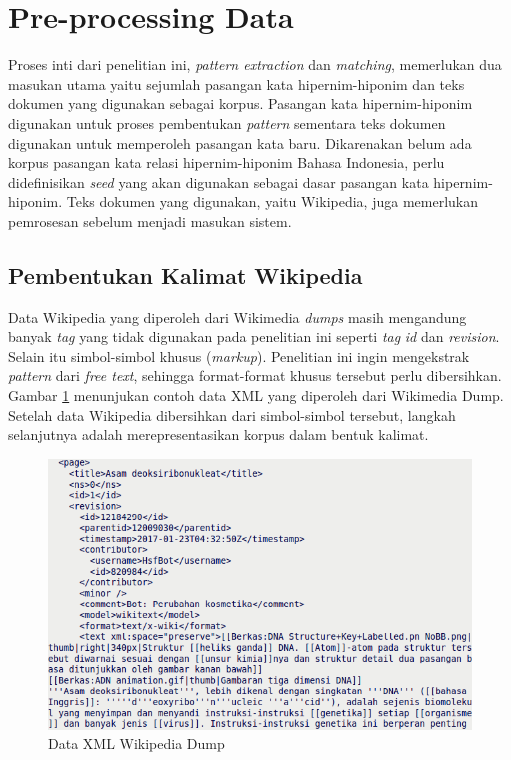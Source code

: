 \section{Pre-processing Data}
Proses inti dari penelitian ini, \textit{pattern extraction} dan \textit{matching}, memerlukan dua masukan utama yaitu sejumlah pasangan kata hipernim-hiponim dan teks dokumen yang digunakan sebagai korpus. Pasangan kata hipernim-hiponim digunakan untuk proses pembentukan \textit{pattern} sementara teks dokumen digunakan untuk memperoleh pasangan kata baru. Dikarenakan belum ada korpus pasangan kata relasi hipernim-hiponim Bahasa Indonesia, perlu didefinisikan \textit{seed} yang akan digunakan sebagai dasar pasangan kata hipernim-hiponim. Teks dokumen yang digunakan, yaitu Wikipedia, juga memerlukan pemrosesan sebelum menjadi masukan sistem.

\subsection{Pembentukan Kalimat Wikipedia}
Data Wikipedia yang diperoleh dari Wikimedia \textit{dumps} masih mengandung banyak \textit{tag} yang tidak digunakan pada penelitian ini seperti \textit{tag} \textit{id} dan \textit{revision}. Selain itu simbol-simbol khusus (\textit{markup}). Penelitian ini ingin mengekstrak \textit{pattern} dari \textit{free text}, sehingga format-format khusus tersebut perlu dibersihkan. Gambar \ref{fig:wiki-dump} menunjukan contoh data XML yang diperoleh dari Wikimedia Dump. Setelah data Wikipedia dibersihkan dari simbol-simbol tersebut, langkah selanjutnya adalah merepresentasikan korpus dalam bentuk kalimat. 

\begin{figure}
    \centering
    \includegraphics[width=\linewidth]{pics/WikipediaDump}
    \caption{Data XML Wikipedia Dump}
    \label{fig:wiki-dump}
\end{figure}

